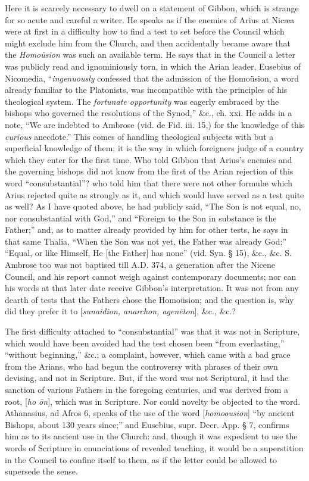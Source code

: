 Here
it is scarcely necessary to dwell on a statement of Gibbon, which is
strange for so acute and careful a writer. He speaks as if the enemies
of Arius at Nicæa were at first in a difficulty how to find a test to
set before the Council which might exclude him from the Church, and
then accidentally became aware that the \emph{Homoüsion} was such an
available term. He says that in the Council a letter was publicly read
and ignominiously torn, in which the Arian leader, Eusebius of
Nicomedia, ``\emph{ingenuously} confessed that the admission of the
Homoüsion, a word already familiar to the Platonists, was
incompatible with the principles of his theological system. The \emph{fortunate
opportunity} was eagerly embraced by the bishops who governed
the resolutions of the Synod,'' \&c., ch. xxi. He adds in a note, ``We
are indebted to Ambrose (vid. de Fid. iii. 15,) for the knowledge of
this \emph{curious} anecdote.'' This comes of handling theological
subjects with but a superficial knowledge of them; it is the way in
which foreigners judge of a country which they enter for the first
time. Who told Gibbon that Arius's enemies and the governing bishops
did not know from the first of the Arian rejection of this word ``consubstantial''?
who told him that there were not other formulæ which Arius rejected
quite as strongly as it, and which would have served as a test quite
as well? As I have quoted above, he had publicly said, ``The Son is not
equal, no, nor consubstantial with God,'' and ``Foreign to the Son in
substance is the Father;'' and, as to matter already provided by him
for other tests, he says in that same Thalia, ``When the Son was not
yet, the Father was already God;'' ``Equal, or like Himself, He [the
Father] has none'' (vid. Syn. § 15), \&c., \&c. S. Ambrose too
was not baptised till A.D.
374, a generation after the Nicene Council, and his report cannot
weigh against contemporary documents; nor can his words at that later
date receive Gibbon's interpretation. It was not from any dearth of
tests that the Fathers chose the Homoüsion; and the question is, why
did they prefer it to [\emph{sunaidion, anarchon, agen\={e}ton}],
\&c., \&c.?

The
first difficulty attached to ``consubstantial'' was that it was not in
Scripture, which would have been avoided had the test chosen been ``from
everlasting,'' ``without beginning,'' \&c.; a complaint, however,
which came with a bad grace from the Arians, who had begun the
controversy with phrases of their own devising, and not in Scripture.
But, if the word was not Scriptural, it had the sanction of various
Fathers in the foregoing centuries, and was derived from a root, [\emph{ho
\={o}n}], which was in Scripture. Nor could novelty be objected
to the word. Athanasius, ad Afros 6, speaks of the use of the word [\emph{homoousion}]
``by ancient Bishops, about 130 years since;'' and Eusebius, supr. Decr.
App. § 7, confirms him as to its ancient use in the Church: and,
though it was expedient to use the words of Scripture in enunciations
of revealed teaching, it would be a superstition in the Council to
confine itself to them, as if the letter could be allowed to supersede
the sense.

